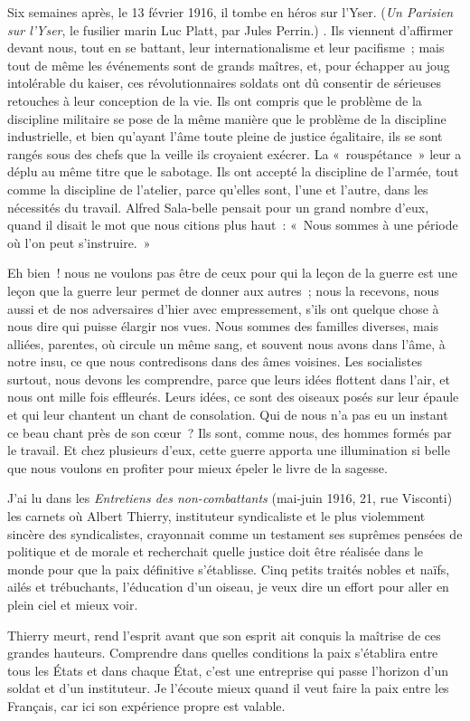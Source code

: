 \documentclass[french,twoside]{book} %
\begin{document}
{ Six semaines après, le 13 février 1916, il tombe en héros sur l’Yser. ({\itshape Un Parisien sur l’Yser}, le fusilier marin Luc Platt, par Jules Perrin.)
 }. Ils viennent d’affirmer devant nous, tout en se battant, leur internationalisme et leur pacifisme ; mais tout de même les événements sont de grands maîtres, et, pour échapper au joug intolérable du kaiser, ces révolutionnaires soldats ont dû consentir de sérieuses retouches à leur conception de la vie. Ils ont compris que le problème de la discipline militaire se pose de la même manière que le problème de la discipline industrielle, et bien qu’ayant l’âme toute pleine de justice égalitaire, ils se sont rangés sous des chefs que la veille ils croyaient exécrer. La « rouspétance » leur a déplu au même titre que le sabotage. Ils ont accepté la discipline de l’armée, tout comme la discipline de l’atelier, parce qu’elles sont, l’une et l’autre, dans les nécessités du travail. Alfred Sala-belle pensait pour un grand nombre d’eux, quand il disait le mot que nous citions plus haut : « Nous sommes à une période où l’on peut s’instruire. » ‌\par
Eh bien ! nous ne voulons pas être de ceux pour qui la leçon de la guerre est une leçon que la guerre leur permet de donner aux autres ; nous la recevons, nous aussi et de nos adversaires d’hier avec empressement, s’ils ont quelque chose à nous dire qui puisse élargir nos vues. Nous sommes des familles diverses, mais alliées, parentes, où circule un même sang, et souvent nous avons dans l’âme, à notre insu, ce que nous contredisons dans des âmes voisines. Les socialistes surtout, nous devons les comprendre, parce que leurs idées flottent dans l’air, et nous ont mille fois effleurés. Leurs idées, ce sont des oiseaux posés sur leur épaule et qui leur chantent un chant de consolation. Qui de nous n’a pas eu un instant ce beau chant près de son cœur ? Ils sont, comme nous, des hommes formés par le travail. Et chez plusieurs d’eux, cette guerre apporta une illumination si belle que nous voulons en profiter pour mieux épeler le livre de la sagesse.‌\par
J’ai lu dans les {\itshape Entretiens des non-combattants} (mai-juin 1916, 21, rue Visconti) les carnets où Albert Thierry, instituteur syndicaliste et le plus violemment sincère des syndicalistes, crayonnait comme un testament ses suprêmes pensées de politique et de morale et recherchait quelle justice doit être réalisée dans le monde pour que la paix définitive s’établisse. Cinq petits traités nobles et naïfs, ailés et trébuchants, l’éducation d’un oiseau, je veux dire un effort pour aller en plein ciel et mieux voir.‌\par
Thierry meurt, rend l’esprit avant que son esprit ait conquis la maîtrise de ces grandes hauteurs. Comprendre dans quelles conditions la paix s’établira entre tous les États et dans chaque État, c’est une entreprise qui passe l’horizon d’un soldat et d’un instituteur. Je l’écoute mieux quand il veut faire la paix entre les Français, car ici son expérience propre est valable.‌\par
\end{document}
